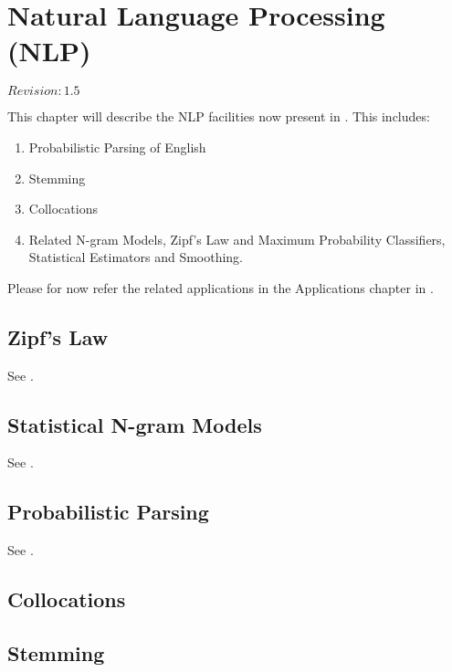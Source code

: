 \chapter{Natural Language Processing (NLP)}

$Revision: 1.5 $

This chapter will describe the NLP facilities now
present in {\marf}. This includes:

\begin{enumerate}
\item Probabilistic Parsing of English
\item Stemming
\item Collocations
\item Related N-gram Models, Zipf's Law and Maximum Probability Classifiers, Statistical Estimators and Smoothing.
\end{enumerate}

Please for now refer the related applications in the
Applications chapter in .

{\todo}

\section{Zipf's Law}

See .

{\todo}

\section{Statistical N-gram Models}

See .

{\todo}

\section{Probabilistic Parsing}

See .

{\todo}

\section{Collocations}
{\todo}

\section{Stemming}
{\todo}

